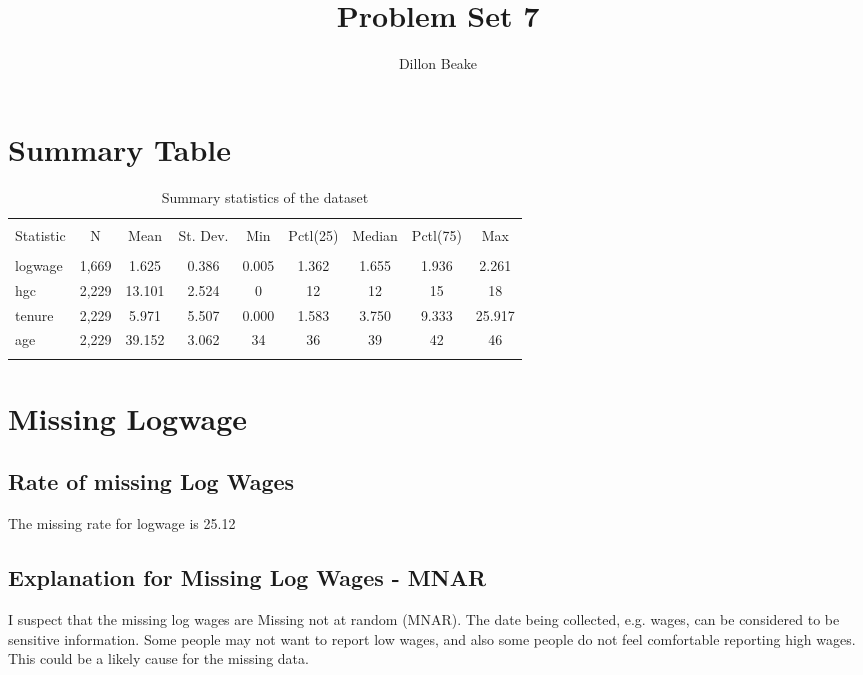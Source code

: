 \documentclass{article}
\title{Problem Set 7}
\author{Dillon Beake}
\begin{document}
\maketitle


\section{Summary Table}

\begin{table}[!htbp] \centering 
  \caption{Summary statistics of the dataset} 
  \label{} 
\begin{tabular}{@{\extracolsep{5pt}}lcccccccc} 
\\[-1.8ex]\hline 
\hline \\[-1.8ex] 
Statistic & \multicolumn{1}{c}{N} & \multicolumn{1}{c}{Mean} & \multicolumn{1}{c}{St. Dev.} & \multicolumn{1}{c}{Min} & \multicolumn{1}{c}{Pctl(25)} & \multicolumn{1}{c}{Median} & \multicolumn{1}{c}{Pctl(75)} & \multicolumn{1}{c}{Max} \\ 
\hline \\[-1.8ex] 
logwage & 1,669 & 1.625 & 0.386 & 0.005 & 1.362 & 1.655 & 1.936 & 2.261 \\ 
hgc & 2,229 & 13.101 & 2.524 & 0 & 12 & 12 & 15 & 18 \\ 
tenure & 2,229 & 5.971 & 5.507 & 0.000 & 1.583 & 3.750 & 9.333 & 25.917 \\ 
age & 2,229 & 39.152 & 3.062 & 34 & 36 & 39 & 42 & 46 \\ 
\hline \\[-1.8ex] 
\end{tabular} 
\end{table}

\section{Missing Logwage}

\subsection{Rate of missing Log Wages}


The missing rate for logwage is 25.12%

\subsection{Explanation for Missing Log Wages - MNAR}

I suspect that the missing log wages are Missing not at random (MNAR).  The date being collected, e.g. wages, can be considered to be sensitive information.  Some people may not want to report low wages, and also some people do not feel comfortable reporting high wages.  This could be a likely cause for the missing data.
\end{document}
